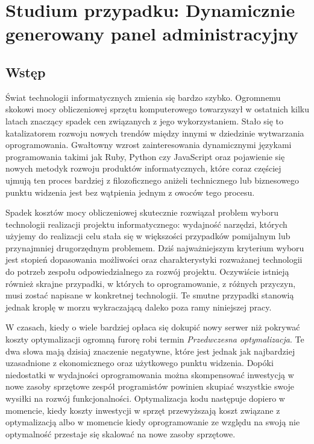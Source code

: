 
\chapter[Studium przypadku: Dynamicznie generowany panel administracyjny]{Studium przypadku: Dynamicznie generowany panel administracyjny}
  \section{Wstęp}
  Świat technologii informatycznych zmienia się bardzo szybko. Ogromnemu skokowi mocy obliczeniowej sprzętu komputerowego towarzyszył w ostatnich kilku latach znaczący spadek cen związanych z jego wykorzystaniem. Stało się to katalizatorem rozwoju nowych trendów między innymi w dziedzinie wytwarzania oprogramowania. Gwałtowny wzrost zainteresowania dynamicznymi językami programowania takimi jak Ruby, Python czy JavaScript oraz pojawienie się nowych metodyk rozwoju produktów informatycznych, które coraz częściej ujmują ten proces bardziej z filozoficznego aniżeli technicznego lub biznesowego punktu widzenia jest bez wątpienia jednym z owoców tego procesu.
  
  Spadek kosztów mocy obliczeniowej skutecznie rozwiązał problem wyboru technologii realizacji projektu informatycznego: wydajność narzędzi, których użyjemy do realizacji celu stała się w większości przypadków pomijalnym lub przynajmniej drugorzędnym problemem. Dziś najważniejszym kryterium wyboru jest stopień dopasowania możliwości oraz charakterystyki rozważanej technologii do potrzeb zespołu odpowiedzialnego za rozwój projektu. Oczywiście istnieją również skrajne przypadki, w których to oprogramowanie, z różnych przyczyn, musi zostać napisane w konkretnej technologii. Te smutne przypadki stanowią jednak kroplę w morzu wykraczającą daleko poza ramy niniejszej pracy.
  
  W czasach, kiedy o wiele bardziej opłaca się dokupić nowy serwer niż pokrywać koszty optymalizacji ogromną furorę robi termin \emph{Przedwczesna optymalizacja}. Te dwa słowa mają dzisiaj znaczenie negatywne, które jest jednak jak najbardziej uzasadnione z ekonomicznego oraz użytkowego punktu widzenia. Dopóki niedostatki w wydajności oprogramowania można skompensować inwestycją w nowe zasoby sprzętowe zespół programistów powinien skupiać wszystkie swoje wysiłki na rozwój funkcjonalności. Optymalizacja kodu następuje dopiero w momencie, kiedy koszty inwestycji w sprzęt przewyższają koszt związane z optymalizacją albo w momencie kiedy oprogramowanie ze względu na swoją nie optymalność przestaje się skalować na nowe zasoby sprzętowe.
  
